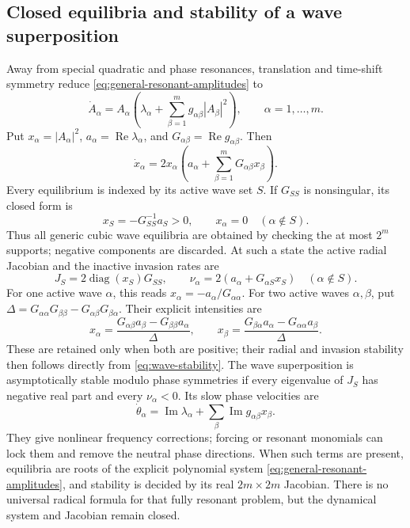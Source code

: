 \documentclass[11pt]{article}
\newcommand{\RePart}{\operatorname{Re}}
\newcommand{\ImPart}{\operatorname{Im}}
\begin{document}
\subsection{Closed equilibria and stability of a wave superposition}

Away from special quadratic and phase resonances, translation and time-shift
symmetry reduce \eqref{eq:general-resonant-amplitudes} to
\begin{equation}
 \dot A_\alpha=A_\alpha\left(\lambda_\alpha+
 \sum_{\beta=1}^m g_{\alpha\beta}|A_\beta|^2\right),
 \qquad \alpha=1,\ldots,m.
 \label{eq:m-wave-amplitudes}
\end{equation}
Put $x_\alpha=|A_\alpha|^2$, $a_\alpha=\RePart\lambda_\alpha$, and
$G_{\alpha\beta}=\RePart g_{\alpha\beta}$.  Then
\begin{equation}
 \dot x_\alpha=2x_\alpha\left(a_\alpha+
 \sum_{\beta=1}^mG_{\alpha\beta}x_\beta\right).
 \label{eq:intensity-system}
\end{equation}
Every equilibrium is indexed by its active wave set $S$.  If $G_{SS}$ is
nonsingular, its closed form is
\begin{equation}
 x_S=-G_{SS}^{-1}a_S>0,\qquad x_\alpha=0\quad(\alpha\notin S).
 \label{eq:all-wave-equilibria}
\end{equation}
Thus all generic cubic wave equilibria are obtained by checking the at most
$2^m$ supports; negative components are discarded.  At such a state the
active radial Jacobian and the inactive invasion rates are
\begin{equation}
 J_S=2\operatorname{diag}(x_S)G_{SS},\qquad
 \nu_\alpha=2\left(a_\alpha+G_{\alpha S}x_S\right)
 \quad(\alpha\notin S).
 \label{eq:wave-stability}
\end{equation}
For one active wave $\alpha$, this reads
$x_\alpha=-a_\alpha/G_{\alpha\alpha}$.  For two active waves $\alpha,\beta$,
put
$\Delta=G_{\alpha\alpha}G_{\beta\beta}
-G_{\alpha\beta}G_{\beta\alpha}$.  Their explicit intensities are
\begin{equation}
 x_\alpha=\frac{G_{\alpha\beta}a_\beta
 -G_{\beta\beta}a_\alpha}{\Delta},\qquad
 x_\beta=\frac{G_{\beta\alpha}a_\alpha
 -G_{\alpha\alpha}a_\beta}{\Delta}.
 \label{eq:two-wave-general-root}
\end{equation}
These are retained only when both are positive; their radial and invasion
stability then follows directly from \eqref{eq:wave-stability}.
The wave superposition is asymptotically stable modulo phase symmetries if
every eigenvalue of $J_S$ has negative real part and every $\nu_\alpha<0$.
Its slow phase velocities are
\begin{equation}
 \dot\theta_\alpha=\ImPart\lambda_\alpha+
 \sum_\beta\ImPart g_{\alpha\beta}x_\beta.
\end{equation}
They give nonlinear frequency corrections; forcing or resonant monomials can
lock them and remove the neutral phase directions.  When such terms are
present, equilibria are roots of the explicit polynomial system
\eqref{eq:general-resonant-amplitudes}, and stability is decided by its real
$2m\times2m$ Jacobian.  There is no universal radical formula for that fully
resonant problem, but the dynamical system and Jacobian remain closed.
\end{document}
